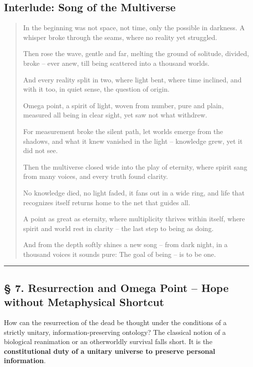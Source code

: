\documentclass[
  english,
]{article}
\begin{document}
\subsection{Interlude: Song of the
Multiverse}\label{interlude-song-of-the-multiverse}

\begin{quote}
In the beginning was not space, not time, only the possible in darkness.
A whisper broke through the seams, where no reality yet struggled.

Then rose the wave, gentle and far, melting the ground of solitude,
divided, broke -- ever anew, till being scattered into a thousand
worlds.

And every reality split in two, where light bent, where time inclined,
and with it too, in quiet sense, the question of origin.

Omega point, a spirit of light, woven from number, pure and plain,
measured all being in clear sight, yet saw not what withdrew.

For measurement broke the silent path, let worlds emerge from the
shadows, and what it knew vanished in the light -- knowledge grew, yet
it did not see.

Then the multiverse closed wide into the play of eternity, where spirit
sang from many voices, and every truth found clarity.

No knowledge died, no light faded, it fans out in a wide ring, and life
that recognizes itself returns home to the net that guides all.

A point as great as eternity, where multiplicity thrives within itself,
where spirit and world rest in clarity -- the last step to being as
doing.

And from the depth softly shines a new song -- from dark night, in a
thousand voices it sounds pure: The goal of being -- is to be one.
\end{quote}

\begin{center}\rule{0.5\linewidth}{0.5pt}\end{center}

\subsection{§ 7. Resurrection and Omega Point -- Hope without
Metaphysical
Shortcut}\label{resurrection-and-omega-point-hope-without-metaphysical-shortcut}

How can the resurrection of the dead be thought under the conditions of
a strictly unitary, information-preserving ontology? The classical
notion of a biological reanimation or an otherworldly survival falls
short. It is the \textbf{constitutional duty of a unitary universe to
preserve personal information}.
\end{document}
